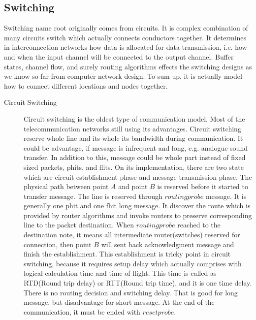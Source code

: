         \subsection{Switching}
        Switching name root originally comes from circuits. It is complex combination of many circuits switch which actually connects conductors together. It determines in interconnection networks how data is allocated for data transmission, i.e. how and when the input channel will be connected to the output channel. Buffer states, channel flow, and surely routing algorithms effects the switching designs as we know so far from computer network design. To sum up, it is actually model how to connect different locations and nodes together\cite{ComputerArchCoursera}.
        \begin{description}
            \item[Circuit Switching] Circuit switching is the oldest type of communication model. Most of the telecommunication networks still using its advantages. Circuit switching reserve whole line and its whole its bandwidth during communication. It could be advantage, if message is infrequent and long, e.g. analogue sound transfer. In addition to this, message could be whole part instead of fixed sized packets, phits, and flits. On its implementation, there are two state which are circuit establishment phase and message transmission phase\cite{0122007514}. The physical path between point $A$ and point $B$ is reserved before it started to transfer message. The line is reserved through $routing probe$ message. It is generally one phit and one fhit long message. It discover the route which is provided by router algorithms and invoke routers to preserve corresponding line to the packet destination. When $routing probe$ reached to the destination note, it means all intermediate router(switches) reserved for connection, then point $B$ will sent back acknowledgment message and finish the establishment. This establishment is tricky point in circuit switching, because it requires setup delay which actually comprises with logical calculation time and time of flight. This time is called as RTD(Round trip delay) or RTT(Round trip time), and it is one time delay. There is no routing decision and switching delay. That is good for long message, but disadvantage for short message. At the end of the communication, it must be ended with $reset probe$.

\end{description}
